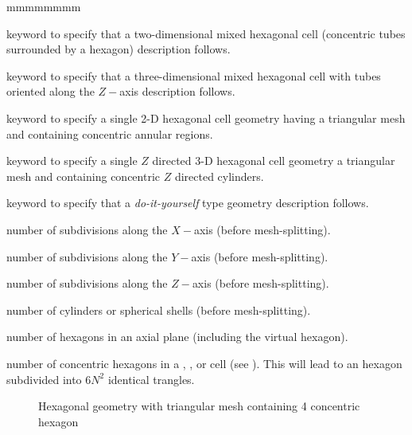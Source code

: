 \begin{ListeDeDescription}{mmmmmmmm}
\item[\moc{HEXCEL}] keyword to specify that a two-dimensional mixed hexagonal cell (concentric tubes surrounded by a hexagon) description follows.

\item[\moc{HEXCELZ}] keyword to specify that a three-dimensional mixed hexagonal cell with tubes oriented along the $Z-$axis description follows.

\item[\moc{HEXTCEL}] keyword to specify a single 2-D hexagonal cell geometry having a triangular mesh and containing concentric annular regions.

\item[\moc{HEXTCELZ}] keyword to specify a single $Z$ directed 3-D hexagonal cell geometry a triangular mesh and containing concentric $Z$ directed cylinders. 

\item[\moc{GROUP}] keyword to specify that a {\sl do-it-yourself} type geometry
description follows.

\item[\dusa{lx}] number of subdivisions along the $X-$axis (before
mesh-splitting).

\item[\dusa{ly}] number of subdivisions along the $Y-$axis (before
mesh-splitting).

\item[\dusa{lz}] number of subdivisions along the $Z-$axis (before
mesh-splitting).

\item[\dusa{lr}] number of cylinders or spherical shells (before
mesh-splitting).

\item[\dusa{lh}] number of hexagons in an axial plane (including the virtual
hexagon).

\item[\dusa{nhr}] number of concentric hexagons in a , ,  or   cell (see ). This will lead to an hexagon subdivided into $6N^{2}$ identical trangles.

\begin{figure}[h!]  
\begin{center} 
\parbox{9.0cm}{\epsfxsize=9cm }
\parbox{14cm}{\caption{Hexagonal geometry with triangular mesh containing 4 concentric hexagon}\label{fig:GeoHEXT4}}   
\end{center}  
\end{figure}


\end{ListeDeDescription}
